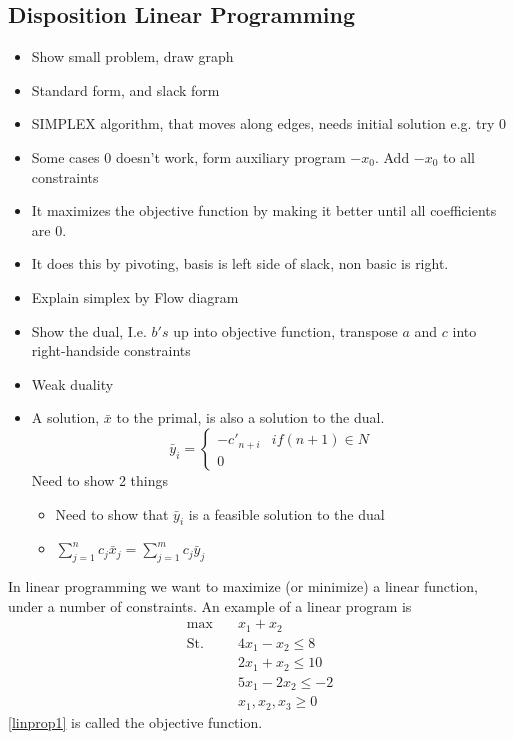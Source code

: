 \documentclass[10pt]{article}
\begin{document}
\subsection{Disposition Linear Programming} %
\label{sub:disposition2}
\begin{itemize}
  \item Show small problem, draw graph
  \item Standard form, and slack form
  \item SIMPLEX algorithm, that moves along edges, needs initial solution e.g. try $0$
  \item Some cases $0$ doesn't work, form auxiliary program $-x_0$. Add $-x_0$ to all constraints
  \item It maximizes the objective function by making it better until all coefficients are $0$.
  \item It does this by pivoting, basis is left side of slack, non basic is right.
  \item Explain simplex by Flow diagram
  \item Show the dual, I.e. $b's$ up into objective function, transpose $a$ and $c$ into right-handside constraints
  \item Weak duality
  \item A solution, $\bar{x}$ to the primal, is also a solution to the dual. 
  \begin{equation} 
  \bar{y}_i = 
  \left\{
  \begin{array}{rl} 
    -c'_{n+i} & if (n+1) \in N \\
    0 &  
  \end{array} 
  \right. 
  \end{equation} 
  Need to show 2 things
  \begin{itemize}
    \item Need to show that $\bar{y}_i$ is a feasible solution to the dual
    \item $\sum_{j=1}^n c_j\bar{x}_j = \sum_{j=1}^m c_j\bar{y}_j$
  \end{itemize}
\end{itemize}
\newpage
In linear programming we want to maximize (or minimize) a linear function, under a number of constraints. An example of a linear program is
\begin{align}
 \max &\quad x_1 + x_2 \label{linprop1}\\ 
 \text{St.} &\quad  4x_1 - x_2  \leq 8 \nonumber\\
            &\quad  2x_1 + x_2  \leq 10 \nonumber\\
            &\quad  5x_1 - 2x_2 \leq -2 \nonumber\\            
            &\quad  x_1,x_2,x_3 \geq 0  \nonumber
\end{align}
\ref{linprop1} is called the objective function.
                                                                      
\end{document}
